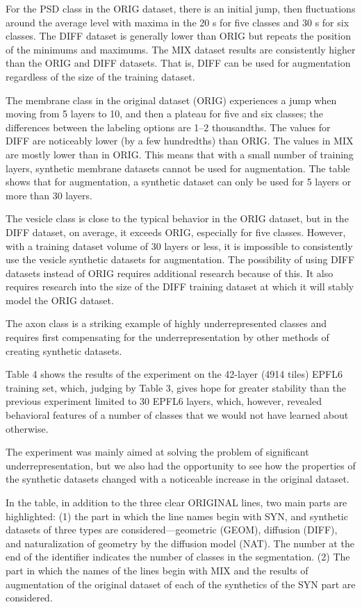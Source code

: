 \documentclass[journal,article,submit,pdftex,moreauthors]{Definitions/mdpi}
\begin{document}
For the PSD class in the ORIG dataset, there is an initial jump, then fluctuations around the average level with maxima in the 20 s for five classes and 30 s for six classes. The DIFF dataset is generally lower than ORIG but repeats the position of the minimums and maximums. The MIX dataset results are consistently higher than the ORIG and DIFF datasets. That is, DIFF can be used for augmentation regardless of the size of the training dataset.

The membrane class in the original dataset (ORIG) experiences a jump when moving from 5 layers to 10, and then a plateau for five and six classes; the differences between the labeling options are 1–2 thousandths. The values for DIFF are noticeably lower (by a few hundredths) than ORIG. The values in MIX are mostly lower than in ORIG. This means that with a small number of training layers, synthetic membrane datasets cannot be used for augmentation. The table shows that for augmentation, a synthetic dataset can only be used for 5 layers or more than 30 layers.

The vesicle class is close to the typical behavior in the ORIG dataset, but in the DIFF dataset, on average, it exceeds ORIG, especially for five classes. However, with a training dataset volume of 30 layers or less, it is impossible to consistently use the vesicle synthetic datasets for augmentation. The possibility of using DIFF datasets instead of ORIG requires additional research because of this. It also requires research into the size of the DIFF training dataset at which it will stably model the ORIG dataset.

The axon class is a striking example of highly underrepresented classes and requires first compensating for the underrepresentation by other methods of creating synthetic datasets.

Table 4 shows the results of the experiment on the 42-layer (4914 tiles) EPFL6 training set, which, judging by Table 3, gives hope for greater stability than the previous experiment limited to 30 EPFL6 layers, which, however, revealed behavioral features of a number of classes that we would not have learned about otherwise.

The experiment was mainly aimed at solving the problem of significant underrepresentation, but we also had the opportunity to see how the properties of the synthetic datasets changed with a noticeable increase in the original dataset.

In the table, in addition to the three clear ORIGINAL lines, two main parts are highlighted: (1) the part in which the line names begin with SYN, and synthetic datasets of three types are considered—geometric (GEOM), diffusion (DIFF), and naturalization of geometry by the diffusion model (NAT). The number at the end of the identifier indicates the number of classes in the segmentation. (2) The part in which the names of the lines begin with MIX and the results of augmentation of the original dataset of each of the synthetics of the SYN part are considered.
\end{document}
